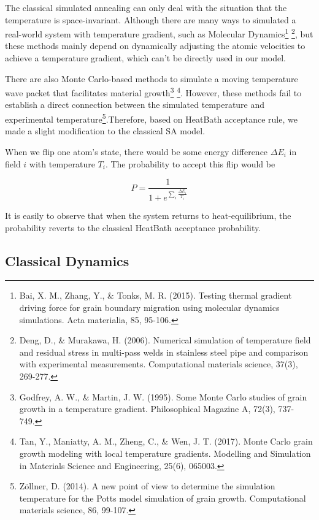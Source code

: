 \documentclass[twocolumn,superscriptaddress,english,showpacs,longbibliography]{revtex4-2}
\begin{document}
The classical simulated annealing can only deal with the situation that
the temperature is space-invariant. Although there are many ways to
simulated a real-world system with temperature gradient, such as
Molecular Dynamics\footnote{Bai, X. M., Zhang, Y., \& Tonks, M. R.
  (2015). Testing thermal gradient driving force for grain boundary
  migration using molecular dynamics simulations. Acta materialia, 85,
  95-106.} \footnote{Deng, D., \& Murakawa, H. (2006). Numerical
  simulation of temperature field and residual stress in multi-pass
  welds in stainless steel pipe and comparison with experimental
  measurements. Computational materials science, 37(3), 269-277.}, but
these methods mainly depend on dynamically adjusting the atomic
velocities to achieve a temperature gradient, which can't be directly
used in our model.

There are also Monte Carlo-based methods to simulate a moving
temperature wave packet that facilitates material growth\footnote{Godfrey,
  A. W., \& Martin, J. W. (1995). Some Monte Carlo studies of grain
  growth in a temperature gradient. Philosophical Magazine A, 72(3),
  737-749.} \footnote{Tan, Y., Maniatty, A. M., Zheng, C., \& Wen, J. T.
  (2017). Monte Carlo grain growth modeling with local temperature
  gradients. Modelling and Simulation in Materials Science and
  Engineering, 25(6), 065003.}. However, these methods fail to establish
a direct connection between the simulated temperature and experimental
temperature\footnote{Zöllner, D. (2014). A new point of view to
  determine the simulation temperature for the Potts model simulation of
  grain growth. Computational materials science, 86, 99-107.}.Therefore,
based on HeatBath acceptance rule, we made a slight modification to the
classical SA model.

When we flip one atom's state, there would be some energy difference
$\Delta E_{i}$ in field $i$ with temperature $T_i$. The
probability to accept this flip would be

\[
P = \frac{1}{1 + e^{\sum_i \frac{\Delta E_i}{T_i}}}
\]

It is easily to observe that when the system returns to
heat-equilibrium, the probability reverts to the classical HeatBath
acceptance probability.

\subsection{Classical Dynamics}\label{classical-dynamics}
\end{document}
